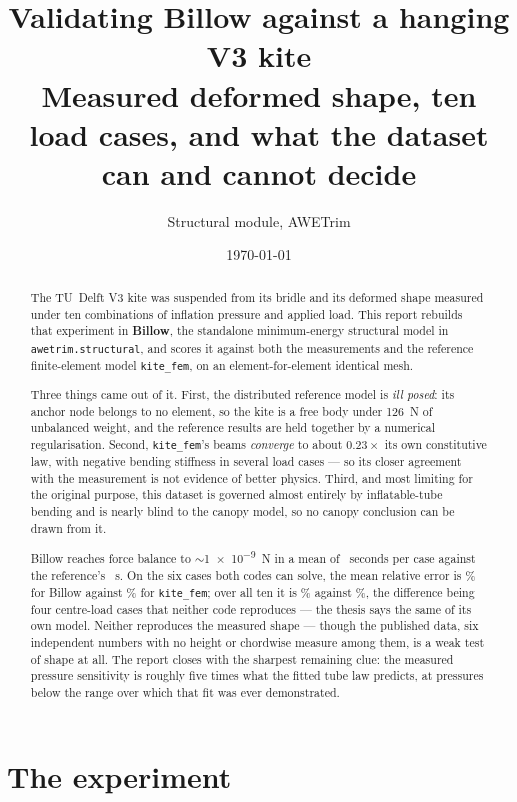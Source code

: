 \documentclass[11pt,a4paper]{article}
\title{\textbf{Validating Billow against a hanging V3 kite}\\[2mm]
\large Measured deformed shape, ten load cases, and what the dataset can and
cannot decide}
\author{Structural module, AWETrim}
\date{\today}
\begin{document}
\maketitle

\begin{abstract}
\noindent
The TU~Delft V3 kite was suspended from its bridle and its deformed shape
measured under ten combinations of inflation pressure and applied load. This
report rebuilds that experiment in \textbf{Billow}, the standalone
minimum-energy structural model in \texttt{awetrim.structural}, and scores it
against both the measurements and the reference finite-element model
\texttt{kite\_fem}, on an element-for-element identical mesh.

Three things came out of it. First, the distributed reference model is
\emph{ill posed}: its anchor node belongs to no element, so the kite is a free
body under \SI{126}{N} of unbalanced weight, and the reference results are held
together by a numerical regularisation. Second, \texttt{kite\_fem}'s beams
\emph{converge} to about $0.23\times$ its own constitutive law, with negative
bending stiffness in several load cases --- so its closer agreement with the
measurement is not evidence of better physics. Third, and most limiting for the
original purpose, this dataset is governed almost entirely by inflatable-tube
bending and is nearly blind to the canopy model, so no canopy conclusion can be
drawn from it.

Billow reaches force balance to $\sim$\SI{1e-9}{N} in a mean of
\billowtime~seconds per case against the reference's \kfemtime~s. On the six
cases both codes can solve, the mean relative error is \billowmeansix\% for
Billow against \kfemmeansix\% for \texttt{kite\_fem}; over all ten it is
\billowmean\% against \kfemmean\%, the difference being four centre-load cases
that neither code reproduces --- the thesis says the same of its own model.
Neither reproduces the measured shape --- though the published data, six
independent numbers with no height or chordwise measure among them, is a weak
test of shape at all. The report closes with the sharpest
remaining clue: the measured pressure sensitivity is roughly five times what
the fitted tube law predicts, at pressures below the range over which that fit
was ever demonstrated.
\end{abstract}

\section{The experiment}
\end{document}
